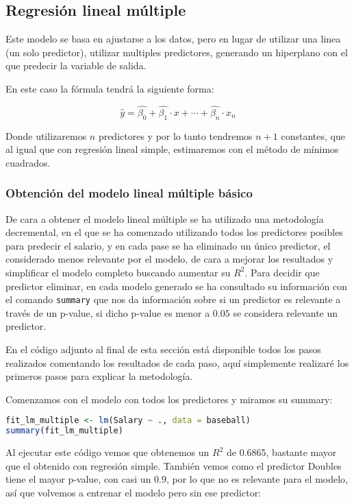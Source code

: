 \subsection{Regresión lineal múltiple}

Este modelo se basa en ajustarse a los datos, pero en lugar de utilizar una linea (un solo predictor), utilizar multiples predictores, generando un hiperplano con el que predecir la variable de salida.

En este caso la fórmula tendrá la siguiente forma:

\[
\hat{y} = \hat{\beta_0} + \hat{\beta_1} \cdot x + \cdots + \hat{\beta_n} \cdot x_n
\]

Donde utilizaremos $n$ predictores y por lo tanto tendremos $n + 1$ constantes, que al igual que con regresión lineal simple, estimaremos con el método de mínimos cuadrados.

\subsubsection{Obtención del modelo lineal múltiple básico}

De cara a obtener el modelo lineal múltiple se ha utilizado una metodología decremental, en el que se ha comenzado utilizando todos los predictores posibles para predecir el salario, y en cada pase se ha eliminado un único predictor, el considerado menos relevante por el modelo, de cara a mejorar los resultados y simplificar el modelo completo buscando aumentar su $R^2$. Para decidir que predictor eliminar, en cada modelo generado se ha consultado su información con el comando \texttt{summary} que nos da información sobre si un predictor es relevante a través de un p-value, si dicho p-value es menor a $0.05$ se considera relevante un predictor.

En el código adjunto al final de esta sección está disponible todos los pasos realizados comentando los resultados de cada paso, aquí simplemente realizaré los primeros pasos para explicar la metodología.

Comenzamos con el modelo con todos los predictores y miramos su summary:

\begin{lstlisting}[language=R]
fit_lm_multiple <- lm(Salary ~ ., data = baseball)
summary(fit_lm_multiple)
\end{lstlisting}

Al ejecutar este código vemos que obtenemos un $R^2$ de 0.6865, bastante mayor que el obtenido con regresión simple. También vemos como el predictor Doubles tiene el mayor p-value, con casi un 0.9, por lo que no es relevante para el modelo, así que volvemos a entrenar el modelo pero sin ese predictor:

